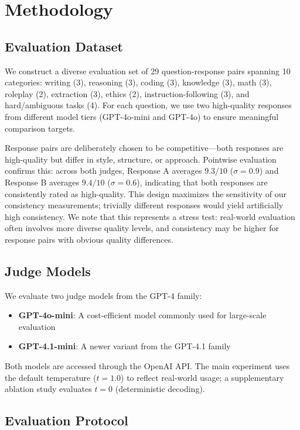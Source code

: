 \documentclass{ijclclp}
\begin{document}
\section{Methodology}

\subsection{Evaluation Dataset}

We construct a diverse evaluation set of 29 question-response pairs spanning 10 categories: writing (3), reasoning (3), coding (3), knowledge (3), math (3), roleplay (2), extraction (3), ethics (2), instruction-following (3), and hard/ambiguous tasks (4). For each question, we use two high-quality responses from different model tiers (GPT-4o-mini and GPT-4o) to ensure meaningful comparison targets.

Response pairs are deliberately chosen to be competitive---both responses are high-quality but differ in style, structure, or approach. Pointwise evaluation confirms this: across both judges, Response A averages $9.3/10$ ($\sigma = 0.9$) and Response B averages $9.4/10$ ($\sigma = 0.6$), indicating that both responses are consistently rated as high-quality. This design maximizes the sensitivity of our consistency measurements; trivially different responses would yield artificially high consistency. We note that this represents a stress test: real-world evaluation often involves more diverse quality levels, and consistency may be higher for response pairs with obvious quality differences.

\subsection{Judge Models}

We evaluate two judge models from the GPT-4 family:
\begin{itemize}[nosep]
    \item \textbf{GPT-4o-mini}: A cost-efficient model commonly used for large-scale evaluation
    \item \textbf{GPT-4.1-mini}: A newer variant from the GPT-4.1 family
\end{itemize}

Both models are accessed through the OpenAI API. The main experiment uses the default temperature ($t=1.0$) to reflect real-world usage; a supplementary ablation study evaluates $t=0$ (deterministic decoding).

\subsection{Evaluation Protocol}
\end{document}
